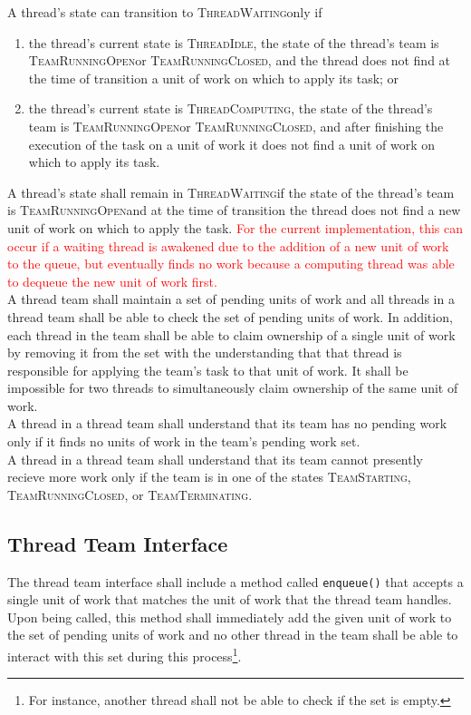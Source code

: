 \documentclass{article}
\newcommand{\TeamStarting}      {\textsc{TeamStarting}}
\newcommand{\TeamRunningOpen}   {\textsc{TeamRunningOpen}}
\newcommand{\TeamRunningClosed} {\textsc{TeamRunningClosed}}
\newcommand{\TeamTerminating}   {\textsc{TeamTerminating}}
\newcommand{\ThreadIdle}        {\textsc{ThreadIdle}}
\newcommand{\ThreadComputing}   {\textsc{ThreadComputing}}
\newcommand{\ThreadWaiting}     {\textsc{ThreadWaiting}}
\begin{document}
A thread's state can transition to \ThreadWaiting only if
\begin{enumerate}
\item{the thread's current state is \ThreadIdle, the state of the thread's team
is \TeamRunningOpen or \TeamRunningClosed, and the thread does not find at the
time of transition a unit of work on which to apply its task; or}
\item{the thread's current state is \ThreadComputing, the state of the thread's
team is \TeamRunningOpen or \TeamRunningClosed, and after finishing the
execution of the task on a unit of work it does not find a unit of work on which
to apply its task.}
\end{enumerate}
A thread's state shall remain in \ThreadWaiting if the state of the thread's
team is \TeamRunningOpen and at the time of transition the thread does not find 
a new unit of work on which to apply the task.  \textcolor{red}{For the current
implementation, this can occur if a waiting thread is awakened due to the
addition of a new unit of work to the queue, but eventually finds no work
because a computing thread was able to dequeue the new unit of work first.}\\


A thread team shall maintain a set of pending units of work and all threads in a
thread team shall be able to check the set of pending units of work.  In
addition, each thread in the team shall be able to claim ownership of a single
unit of work by removing it from the set with the understanding that that thread
is responsible for applying the team's task to that unit of work.  It shall be
impossible for two threads to simultaneously claim ownership of the same unit of
work.\\

A thread in a thread team shall understand that its team has no pending work
only if it finds no units of work in the team's pending work set.\\

A thread in a thread team shall understand that its team cannot presently
recieve more work only if the team is in one of the states \TeamStarting,
\TeamRunningClosed, or \TeamTerminating.

\subsection{Thread Team Interface}

The thread team interface shall include a method called \texttt{enqueue()} that
accepts a single unit of work that matches the unit of work that the thread team
handles.  Upon being called, this method shall immediately add the given unit of
work to the set of pending units of work and no other thread in the team shall
be able to interact with this set during this process\footnote{For instance,
another thread shall not be able to check if the set is empty.}.\\
\end{document}
